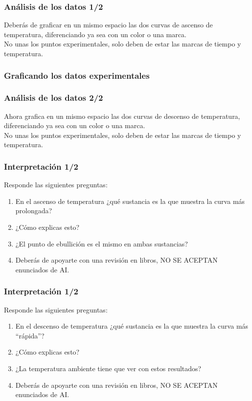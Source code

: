 \documentclass[14pt]{beamer}
\begin{document}
\begin{frame}
\frametitle{Análisis de los datos 1/2}
Deberás de graficar en un mismo espacio las dos curvas de ascenso de temperatura, diferenciando ya sea con un color o una marca.
\\
\bigskip
\pause
No unas los puntos experimentales, solo deben de estar las marcas de tiempo y temperatura.
\end{frame}
\begin{frame}
\frametitle{Graficando los datos experimentales}
\begin{figure}
    \centering
\end{figure}
\end{frame}
\begin{frame}
\frametitle{Análisis de los datos 2/2}
Ahora grafica en un mismo espacio las dos curvas de descenso de temperatura, diferenciando ya sea con un color o una marca.
\\
\bigskip
\pause
No unas los puntos experimentales, solo deben de estar las marcas de tiempo y temperatura.
\end{frame}
\begin{frame}
\frametitle{Interpretación 1/2}
Responde las siguientes preguntas:
\pause
{}
\begin{enumerate}[<+->]
\item En el ascenso de temperatura ¿qué sustancia es la que muestra la curva más prolongada?
\item ¿Cómo explicas esto?
\item ¿El punto de ebullición es el mismo en ambas sustancias?
\item Deberás de apoyarte con una revisión en libros, NO SE ACEPTAN enunciados de AI.
\end{enumerate}
\end{frame}
\begin{frame}
\frametitle{Interpretación 1/2}
Responde las siguientes preguntas:
\pause
{}
\begin{enumerate}[<+->]
\item En el descenso de temperatura ¿qué sustancia es la que muestra la curva más \enquote{rápida}?
\item ¿Cómo explicas esto?
\item ¿La temperatura ambiente tiene que ver con estos resultados?
\item Deberás de apoyarte con una revisión en libros, NO SE ACEPTAN enunciados de AI.
\end{enumerate}
\end{frame}
\end{document}
